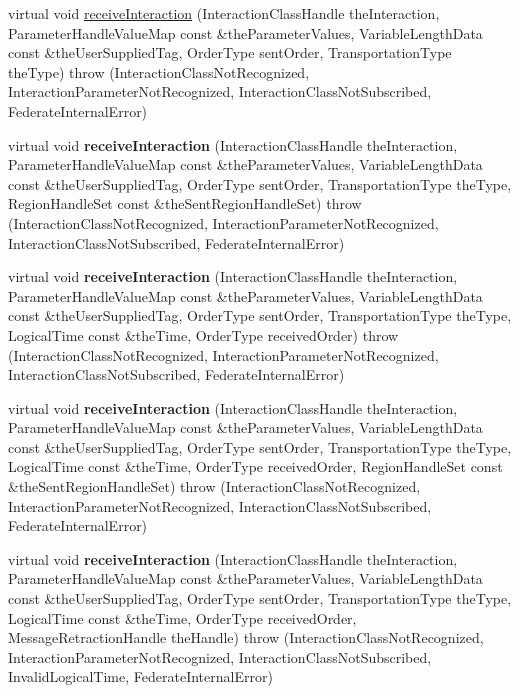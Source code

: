 \begin{DoxyCompactItemize}
\item 
virtual void \hyperlink{class_example_fed_amb_a45f42060f7637ba8832359f2b830a94c}{receiveInteraction} (InteractionClassHandle theInteraction, ParameterHandleValueMap const \&theParameterValues, VariableLengthData const \&theUserSuppliedTag, OrderType sentOrder, TransportationType theType)  throw (InteractionClassNotRecognized, InteractionParameterNotRecognized, InteractionClassNotSubscribed, FederateInternalError)
\item 
\hypertarget{class_example_fed_amb_a68427a7cc9e72248e0c82b017c65eb5f}{
virtual void {\bfseries receiveInteraction} (InteractionClassHandle theInteraction, ParameterHandleValueMap const \&theParameterValues, VariableLengthData const \&theUserSuppliedTag, OrderType sentOrder, TransportationType theType, RegionHandleSet const \&theSentRegionHandleSet)  throw (InteractionClassNotRecognized, InteractionParameterNotRecognized, InteractionClassNotSubscribed, FederateInternalError)}
\label{class_example_fed_amb_a68427a7cc9e72248e0c82b017c65eb5f}

\item 
\hypertarget{class_example_fed_amb_af2de8b135f62a09427bafe12ca0f365a}{
virtual void {\bfseries receiveInteraction} (InteractionClassHandle theInteraction, ParameterHandleValueMap const \&theParameterValues, VariableLengthData const \&theUserSuppliedTag, OrderType sentOrder, TransportationType theType, LogicalTime const \&theTime, OrderType receivedOrder)  throw (InteractionClassNotRecognized, InteractionParameterNotRecognized, InteractionClassNotSubscribed, FederateInternalError)}
\label{class_example_fed_amb_af2de8b135f62a09427bafe12ca0f365a}

\item 
\hypertarget{class_example_fed_amb_a20f86eaa21f48bd9b770f16610385554}{
virtual void {\bfseries receiveInteraction} (InteractionClassHandle theInteraction, ParameterHandleValueMap const \&theParameterValues, VariableLengthData const \&theUserSuppliedTag, OrderType sentOrder, TransportationType theType, LogicalTime const \&theTime, OrderType receivedOrder, RegionHandleSet const \&theSentRegionHandleSet)  throw (InteractionClassNotRecognized, InteractionParameterNotRecognized, InteractionClassNotSubscribed, FederateInternalError)}
\label{class_example_fed_amb_a20f86eaa21f48bd9b770f16610385554}

\item 
\hypertarget{class_example_fed_amb_ab4a518da511884fca73ef5ae13f094ff}{
virtual void {\bfseries receiveInteraction} (InteractionClassHandle theInteraction, ParameterHandleValueMap const \&theParameterValues, VariableLengthData const \&theUserSuppliedTag, OrderType sentOrder, TransportationType theType, LogicalTime const \&theTime, OrderType receivedOrder, MessageRetractionHandle theHandle)  throw (InteractionClassNotRecognized, InteractionParameterNotRecognized, InteractionClassNotSubscribed, InvalidLogicalTime, FederateInternalError)}
\label{class_example_fed_amb_ab4a518da511884fca73ef5ae13f094ff}


\end{DoxyCompactItemize}
